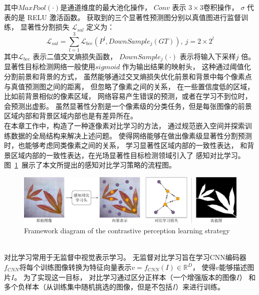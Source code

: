 %
%
其中$MaxPool(\cdot)$是通道维度的最大池化操作，
$ Conv $ 表示 $ 3\times 3 $卷积操作，
$ \sigma $ 代表的是 RELU 激活函数。
获取到的三个显著性预测图分别以真值图进行监督训练，
显著性分割损失
$ \mathcal{L}_{sal} $
定义为：
%
%
\begin{equation}
	\mathcal{L}_{sal} = \sum_{l = 1}^{3}  
	\mathcal{L}_{bce} \left ( P^{l}, DownSample_{j}\left (  GT \right ) 
	\right ), ~ j = 2\times 2^l
	\label{chpt4:eq:loss_sal}
\end{equation}
%
%
其中$\mathcal{L}_{bce}$ 表示二值交叉熵损失函数，
$DownSample_{j}(\cdot)$ 表示将输入下采样$j$ 倍。
%
%
\label{chap:part4_cons}
%
%
显著性目标检测网络一般使用$sigmoid$ 作为输出结果的映射头，
这种通过阈值化分割前景和背景的方式，
虽然能够通过交叉熵损失优化前景和背景中每个像素点与真值预测图之间的距离，
但忽略了像素之间的关系，
在一些置信度低的区域，比如前背景相似的像素区域，
网络容易产生错误的预测，或者在学习不到位时，会预测出虚影。
虽然显著性分割是一个像素级的分类任务，但是每张图像的前景区域内部和背景区域内部也是有差异所在。\\
%
%
%
%
\indent 
在本章工作中，构造了一种逐像素对比学习的方法，
通过规范嵌入空间并探索训练数据的全局结构来解决上述问题。
使得网络能够在做出像素级显著性分割预测时，也能够考虑同类像素之间的关系，
学习显著性区域内部的一致性表达，
和背景区域内部的一致性表达，在光场显著性目标检测领域引入了
感知对比学习。
图~\ref{chpt4:figure:cons_learning}~展示了本文所提出的感知对比学习策略的流程图。
%
%
%
%
\begin{figure}[!ht]
	\centering
	\includegraphics[width=\linewidth]{figures/chapter4/chpt4_cons_learning}
	{Framework diagram of the contrastive perception learning strategy}
	\label{chpt4:figure:cons_learning}
\end{figure}
\\
%
%
%
%
\indent 
对比学习常用于无监督中视觉表示学习。
无监督对比学习旨在学习CNN编码器$f_{CNN}$将每个训练图像转换为特征向量表示$v=f_{CNN}(I) \in \mathbb{R}^{D}$，
使得$v$能够描述图片$I$。
为了实现这一目标，
对比学习通过区分正样本（一个增强版本的图像$I$）
和多个负样本（从训练集中随机挑选的图像，但是不包括$I$）来进行训练。
